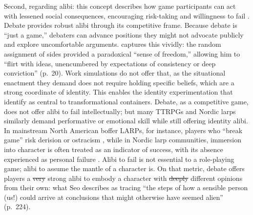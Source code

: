 \documentclass[12pt]{article}
\makeatletter
\providecommand{\DIFaddtex}[1]{{\protect\color[rgb]{0,0.5,0}\uwave{#1}}} %
\providecommand{\DIFdeltex}[1]{{\protect\color{red}\sout{#1}}} %
\providecommand{\DIFaddbegin}{} %
\providecommand{\DIFaddend}{} %
\providecommand{\DIFdelbegin}{} %
\providecommand{\DIFdelend}{} %
\providecommand{\DIFadd}[1]{\texorpdfstring{\DIFaddtex{#1}}{#1}} %
\providecommand{\DIFdel}[1]{\texorpdfstring{\DIFdeltex{#1}}{}} %
\providecommand{\DIFscaledelfig}{0.5}
\newlength{\DIFdelgraphicswidth} %
\newlength{\DIFdelgraphicsheight} %
\providecommand{\DIFaddincludegraphics}[2][]{{\color[rgb]{0,0.5,0}\fbox{\DIFOincludegraphics[#1]{#2}}}} %
\providecommand{\DIFdelincludegraphics}[2][]{%
\sbox{\DIFdelgraphicsbox}{\DIFOincludegraphics[#1]{#2}}%
\settoboxwidth{\DIFdelgraphicswidth}{\DIFdelgraphicsbox} %
\settoboxtotalheight{\DIFdelgraphicsheight}{\DIFdelgraphicsbox} %
\scalebox{\DIFscaledelfig}{%
\parbox[b]{\DIFdelgraphicswidth}{\usebox{\DIFdelgraphicsbox}\\[-\baselineskip] \rule{\DIFdelgraphicswidth}{0em}}\llap{\resizebox{\DIFdelgraphicswidth}{\DIFdelgraphicsheight}{%
\setlength{\unitlength}{\DIFdelgraphicswidth}%
\begin{picture}(1,1)%
\thicklines\linethickness{2pt} %
{\color[rgb]{1,0,0}\put(0,0){\framebox(1,1){}}}%
{\color[rgb]{1,0,0}\put(0,0){\line( 1,1){1}}}%
{\color[rgb]{1,0,0}\put(0,1){\line(1,-1){1}}}%
\end{picture}%
}\hspace*{3pt}}} %
} %
\DeclareRobustCommand{\DIFaddbegin}{\DIFOaddbegin \let\includegraphics\DIFaddincludegraphics} %
\DeclareRobustCommand{\DIFaddend}{\DIFOaddend \let\includegraphics\DIFOincludegraphics} %
\DeclareRobustCommand{\DIFdelbegin}{\DIFOdelbegin \let\includegraphics\DIFdelincludegraphics} %
\DeclareRobustCommand{\DIFdelend}{\DIFOaddend \let\includegraphics\DIFOincludegraphics} %
\let\sout@orig\sout %
\renewcommand{\sout}[1]{\ifmmode\text{\sout@orig{\ensuremath{#1}}}\else\sout@orig{#1}\fi} %
\makeatother
\begin{document}
Second, regarding alibi: this concept describes how game participants can act with lessened social consequences, encouraging risk-taking and willingness to fail \parencite{deterding2017alibis}. Debate provides robust alibi through its competitive frame. Because debate is ``just a game,'' debaters can advance positions they might not advocate publicly and explore uncomfortable arguments. \textcite{seo2022good} captures this vividly: the random assignment of sides provided a paradoxical ``sense of freedom,'' allowing him to ``flirt with ideas, unencumbered by expectations of consistency or deep conviction'' (p.~20). Work simulations do not offer that, as the situational enactment they demand does not require holding specific beliefs, which are a strong coordinate of identity. This enables the identity experimentation that \textcite{bowman2025transformative} identify as central to transformational containers. Debate, as a competitive game, does not offer alibi to fail intellectually; but many TTRPGs and Nordic larps similarly demand performative or emotional skill while still offering identity alibi. In mainstream North American boffer LARPs, for instance, players who ``break game'' risk derision or ostracism \parencite{brown2016culture}, while in Nordic larp communities, immersion into character is often treated as an indicator of success, with its absence experienced as personal failure \parencite{harder2018larp,pohjola2015steering}. Alibi to fail is not essential to a role-playing game; alibi to assume the mantle of a character is. On that metric, debate offers players a \DIFdelbegin \DIFdel{very }\DIFdelend strong alibi to embody a character with \DIFdelbegin \DIFdel{deeply }\DIFdelend \DIFaddbegin \DIFadd{markedly }\DIFaddend different opinions from their own: what Seo describes as tracing ``the steps of how a sensible person (us!) could arrive at conclusions that might otherwise have seemed alien'' (p.~224).
\end{document}
